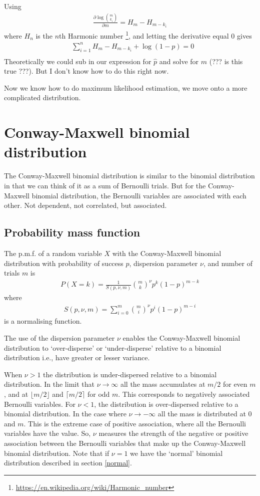 \documentclass[a4paper,12pt]{article}
\theoremstyle{definition}
\newcommand{\pdiff}[2]{\frac{\partial #1}{\partial #2}} %
\begin{document}
Using 
\begin{align}
  \pdiff{\log \binom{m}{k_i}}{m} = H_m - H_{m - k_i}
\end{align}
where $H_n$ is the $n$th Harmonic number \footnote{\url{https://en.wikipedia.org/wiki/Harmonic_number}}, and letting the derivative equal 0 gives 
\begin{align}
   & \sum_{i=1}^n H_m - H_{m - k_i} + \log (1-p) = 0 \\ 
\end{align}
Theoretically we could sub in our expression for $\hat{p}$ and solve for $m$ (??? is this true ???). But I don't know how to do this right now.

Now we know how to do maximum likelihood estimation, we move onto a more complicated distribution.

\section{Conway-Maxwell binomial distribution}
The Conway-Maxwell binomial distribution is similar to the binomial distribution in that we can think of it as a sum of Bernoulli trials. But for the Conway-Maxwell binomial distribution, the Bernoulli variables are associated with each other. Not dependent, not correlated, but associated. 

\subsection{Probability mass function}
The p.m.f. of a random variable $X$ with the Conway-Maxwell binomial distribution with probability of success $p$, dispersion parameter $\nu$, and number of trials $m$ is
\begin{align}
  P(X = k) = \frac{1}{S(p, \nu, m)} \binom{m}{k}^{\nu} p^{k} (1-p)^{m-k}
\end{align}
where 
\begin{align}
  S(p, \nu, m) = \sum_{i=0}^{m} \binom{m}{i}^{\nu} p^{i} (1-p)^{m-i}
\end{align}
is a normalising function. 

The use of the dispersion parameter $\nu$ enables the Conway-Maxwell binomial distribution to `over-disperse' or `under-disperse' relative to a binomial distribution i.e., have greater or lesser variance.

When $\nu > 1$ the distribution is under-dispersed relative to a binomial distribution. In the limit that $\nu \rightarrow \infty$ all the mass accumulates at $m/2$ for even $m$, and at $\lfloor m/2 \rfloor$ and $\lceil m/2 \rceil$ for odd $m$. This corresponds to negatively associated Bernoulli variables. For $\nu < 1$, the distribution is over-dispersed relative to a binomial distribution. In the case where $\nu \rightarrow -\infty$ all the mass is distributed at $0$ and $m$. This is the extreme case of positive association, where all the Bernoulli variables have the value. So, $\nu$ measures the strength of the negative or positive association between the Bernoulli variables that make up the Conway-Maxwell binomial distribution. Note that if $\nu =1$ we have the `normal' binomial distribution described in section \ref{normal}.
\end{document}
